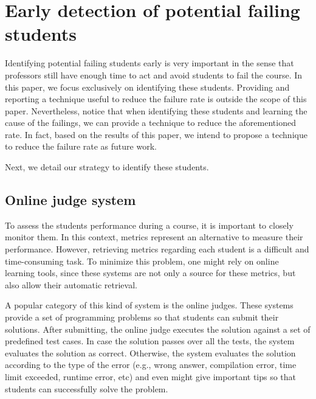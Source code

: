 \section{Early detection of potential failing students}

\label{sec:strategy}

Identifying potential failing students early is very important in the sense that professors still have enough time to act and avoid students to fail the course. In this paper, we focus exclusively on identifying these students. Providing and reporting a technique useful to reduce the failure rate is outside the scope of this paper. Nevertheless, notice that when identifying these students and learning the cause of the failings, we can provide a technique to reduce the aforementioned rate. In fact, based on the results of this paper, we intend to propose a technique to reduce the failure rate as future work.

Next, we detail our strategy to identify these students.

\subsection{Online judge system}

To assess the students performance during a course, it is important to closely monitor them. In this context, metrics represent an alternative to measure their performance. However, retrieving metrics regarding each student is a difficult and time-consuming task. To minimize this problem, one might rely on online learning tools, since these systems are not only a source for these metrics, but also allow their automatic retrieval. 

A popular category of this kind of system is the online judges. These systems provide a set of programming problems so that students can submit their solutions. After submitting, the online judge executes the solution against a set of predefined test cases. In case the solution passes over all the tests, the system evaluates the solution as correct. Otherwise, the system evaluates the solution according to the type of the error (e.g., wrong answer, compilation error, time limit exceeded, runtime error, etc) and even might give important tips so that students can successfully solve the problem.

